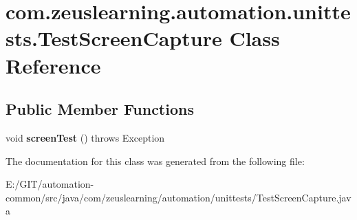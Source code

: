 \hypertarget{classcom_1_1zeuslearning_1_1automation_1_1unittests_1_1TestScreenCapture}{}\section{com.\+zeuslearning.\+automation.\+unittests.\+Test\+Screen\+Capture Class Reference}
\label{classcom_1_1zeuslearning_1_1automation_1_1unittests_1_1TestScreenCapture}
\subsection*{Public Member Functions}
\begin{DoxyCompactItemize}
\item 
\hypertarget{classcom_1_1zeuslearning_1_1automation_1_1unittests_1_1TestScreenCapture_aa9eaa43c6fd6bace40bb6f55d74241ee}{}\label{classcom_1_1zeuslearning_1_1automation_1_1unittests_1_1TestScreenCapture_aa9eaa43c6fd6bace40bb6f55d74241ee} 
void {\bfseries screen\+Test} ()  throws Exception 
\end{DoxyCompactItemize}


The documentation for this class was generated from the following file\+:\begin{DoxyCompactItemize}
\item 
E\+:/\+G\+I\+T/automation-\/common/src/java/com/zeuslearning/automation/unittests/Test\+Screen\+Capture.\+java\end{DoxyCompactItemize}
